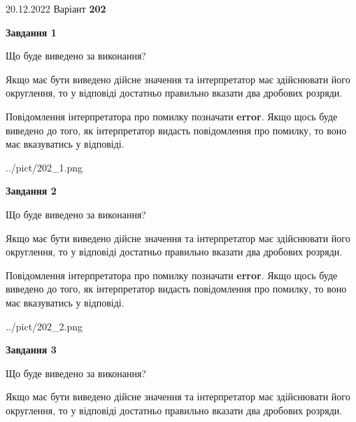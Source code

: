 \documentclass[12pt, ukrainian]{article}
\begin{document}
{20.12.2022 Варіант \No \textbf { 202 }\par}
{
\begin {Large}

{\begin {center}\textbf{Завдання 1}\end {center}}\par
Що буде виведено за виконання? \par

Якщо має бути виведено дійсне значення та інтерпретатор має здійснювати його округлення, 
то у відповіді достатньо правильно вказати два дробових розряди.

Повідомлення інтерпретатора про помилку позначати \textbf{error}.
Якщо щось буде виведено до того, як інтерпретатор видасть повідомлення про помилку, 
то воно має вказуватись у відповіді. \par

\begin{center}
	{../pict/202_1.png}
\end{center}
\newpage

{\begin {center}\textbf{Завдання 2}\end {center}}\par
Що буде виведено за виконання? \par

Якщо має бути виведено дійсне значення та інтерпретатор має здійснювати його округлення, 
то у відповіді достатньо правильно вказати два дробових розряди.

Повідомлення інтерпретатора про помилку позначати \textbf{error}.
Якщо щось буде виведено до того, як інтерпретатор видасть повідомлення про помилку, 
то воно має вказуватись у відповіді. \par

\begin{center}
	{../pict/202_2.png}
\end{center}
\newpage

{\begin {center}\textbf{Завдання 3}\end {center}}\par
Що буде виведено за виконання? \par

Якщо має бути виведено дійсне значення та інтерпретатор має здійснювати його округлення, 
то у відповіді достатньо правильно вказати два дробових розряди.


\end{Large}}
\end{document}
